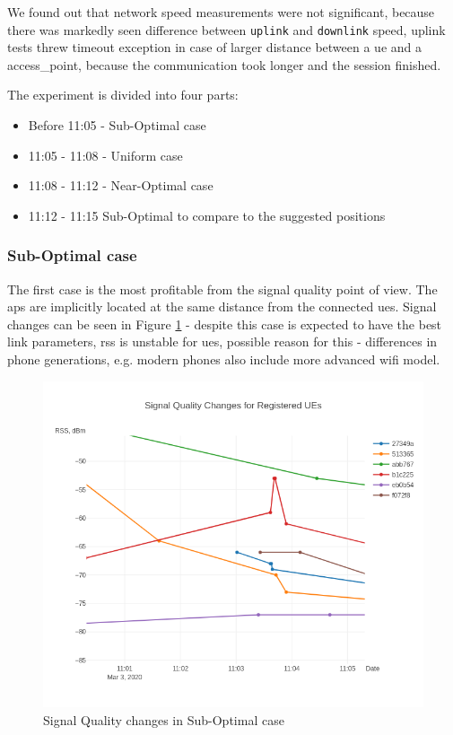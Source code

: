 We found out that network speed measurements were not significant, because there was markedly seen difference between \texttt{uplink} and \texttt{downlink} speed, uplink tests threw timeout exception in case of larger distance between a \gls{ue} and a \gls{access_point}, because the communication took longer and the session finished.

The experiment is divided into four parts:

\begin{itemize}
\tightlist
\item
  Before 11:05 - Sub-Optimal case
\item
  11:05 - 11:08 - Uniform case
\item
  11:08 - 11:12 - Near-Optimal case
\item
  11:12 - 11:15 Sub-Optimal to compare to the suggested positions
\end{itemize}

\subsubsection{Sub-Optimal case}

The first case is the most profitable from the signal quality point of
view. The \glspl{ap} are implicitly located at the same distance from the
connected \glspl{ue}. Signal changes can be seen in Figure \ref{fig:signal-quality-changes-sub-optimal} - despite this case is expected to have the best link parameters, \acrshort{rss} is unstable for \glspl{ue}, possible reason for this - differences in phone generations, e.g. modern phones also include more advanced \gls{wifi} model.

\begin{figure}[H]
	\centering
	\includegraphics[width=0.7\linewidth,keepaspectratio]{images/Exp4_Suboptimal.png}
\caption{Signal Quality changes in Sub-Optimal case}
\label{fig:signal-quality-changes-sub-optimal}
\end{figure}

